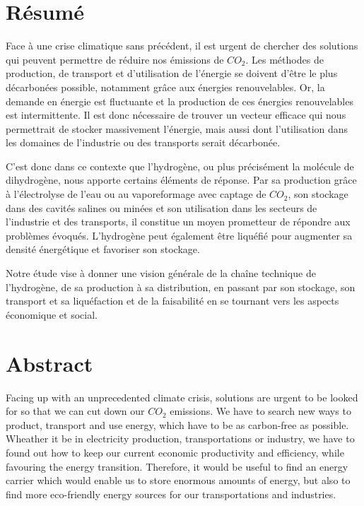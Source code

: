 \documentclass[11pt,french,a4paper]{article}
\begin{document}
\newpage

\section*{Résumé}
Face à une crise climatique sans précédent, il est urgent de chercher des solutions qui peuvent permettre de réduire nos émissions de $CO_2$. Les méthodes de production, de transport et d’utilisation de l’énergie se doivent d’être le plus décarbonées possible, notamment grâce aux énergies renouvelables. Or, la demande en énergie est fluctuante et la production de ces énergies renouvelables est intermittente. Il est donc nécessaire de trouver un vecteur efficace qui nous permettrait de stocker massivement l’énergie, mais aussi dont l’utilisation dans les domaines de l’industrie ou des transports serait décarbonée. 

C’est donc dans ce contexte que l’hydrogène, ou plus précisément la molécule de dihydrogène, nous apporte certains éléments de réponse. Par sa production grâce à l’électrolyse de l’eau ou au vaporeformage avec captage de $CO_2$, son stockage dans des cavités salines ou minées et son utilisation dans les secteurs de l’industrie et des transports, il constitue un moyen prometteur de répondre aux problèmes évoqués. L’hydrogène peut également être liquéfié pour augmenter sa densité énergétique et favoriser son stockage.

Notre étude vise à donner une vision générale de la chaîne technique de l’hydrogène, de sa production à sa distribution, en passant par son stockage, son transport et sa liquéfaction et de la faisabilité en se tournant vers les aspects économique et social.


\section*{Abstract}
Facing up with an unprecedented climate crisis, solutions are urgent to be looked for so that we can cut down our $CO_2$ emissions. We have to search new ways to product, transport and use energy, which have to be as carbon-free as possible. Wheather it be in electricity production, transportations or industry, we have to found out how to keep our current economic productivity and efficiency, while favouring the energy transition. Therefore, it would be useful to find an energy carrier which would enable us to store enormous amounts of energy, but also to find more eco-friendly energy sources for our transportations and industries.
\end{document}
